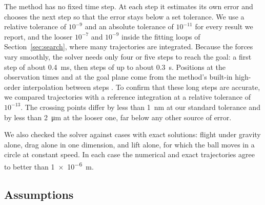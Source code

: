 \documentclass[10pt,a4paper]{article}
\begin{document}
The method has no fixed time step. At each step it estimates its own error
and chooses the next step so that the error stays below a set tolerance. We
use a relative tolerance of $10^{-9}$ and an absolute tolerance of
$10^{-11}$ for every result we report, and the looser $10^{-7}$ and $10^{-9}$
inside the fitting loops of Section~\ref{sec:search}, where many trajectories
are integrated. Because the forces vary smoothly, the solver needs only four
or five steps to reach the goal: a first step of about \SI{0.4}{\milli\second},
then steps of up to about \SI{0.3}{\second}. Positions at the observation
times and at the goal plane come from the method's built-in high-order
interpolation between steps \citep{hairer1993}. To confirm that these long
steps are accurate, we compared trajectories with a reference integration at
a relative tolerance of $10^{-13}$. The crossing points differ by less than
\SI{1}{\nano\metre} at our standard tolerance and by less than
\SI{2}{\micro\metre} at the looser one, far below any other source of error.

We also checked the solver against cases with exact solutions: flight under
gravity alone, drag alone in one dimension, and lift alone, for which the ball
moves in a circle at constant speed. In each case the numerical and exact
trajectories agree to better than \SI{1e-6}{\metre}.

\subsection{Assumptions}
\label{sec:assumptions}
\end{document}
